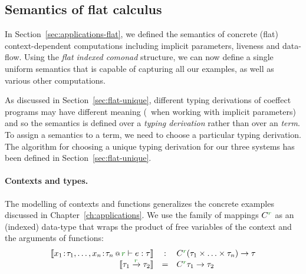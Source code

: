 \begin{figure*}[t]
\label{fig:semantics-flat}
\end{figure*}


\subsection{Semantics of flat calculus}
\label{sec:semantics-flat-calculus}

In Section~\ref{sec:applications-flat}, we defined the semantics of concrete (flat) context-dependent
computations including implicit parameters, liveness and data-flow. Using the \emph{flat indexed
comonad} structure, we can now define a single uniform semantics that is capable of capturing all
our examples, as well as various other computations.

As discussed in Section~\ref{sec:flat-unique}, different typing derivations of coeffect programs
may have different meaning (\eg~when working with implicit parameters) and so the semantics is
defined over a \emph{typing derivation} rather than over an \emph{term}. To assign a semantics to
a term, we need to choose a particular typing derivation. The algorithm for choosing a unique
typing derivation for our three systems has been defined in Section~\ref{sec:flat-unique}.

\paragraph{Contexts and types.}
The modelling of contexts and functions generalizes the concrete examples discussed in
Chapter~\ref{ch:applications}. We use the family of mappings $\ctyp{\cclrd{r}}{}$ as an (indexed)
data-type that wraps the product of free variables of the context and the arguments of functions:
%
\begin{equation*}
\begin{array}{rcl}
\sem{\coctx{x_1\!:\!\tau_1, \ldots, x_n\!:\!\tau_n}{ \cclrd{r} } \vdash e : \tau}
  &:& \ctyp{\cclrd{r}}{(\tau_1 \times \ldots \times \tau_n)} \rightarrow \tau\\
\sem{\tau_1 \xrightarrow{\cclrd{r}} \tau_2} &=& \ctyp{\cclrd{r}}{\tau_1} \rightarrow \tau_2
\end{array}
\end{equation*}

